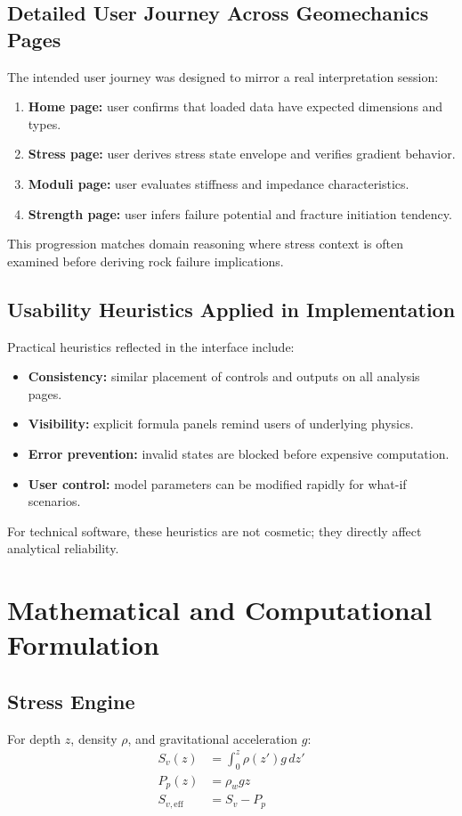 \documentclass[12pt,a4paper]{report}
\begin{document}
\section{Detailed User Journey Across Geomechanics Pages}
The intended user journey was designed to mirror a real interpretation session:
\begin{enumerate}
    \item \textbf{Home page:} user confirms that loaded data have expected dimensions and types.
    \item \textbf{Stress page:} user derives stress state envelope and verifies gradient behavior.
    \item \textbf{Moduli page:} user evaluates stiffness and impedance characteristics.
    \item \textbf{Strength page:} user infers failure potential and fracture initiation tendency.
\end{enumerate}

This progression matches domain reasoning where stress context is often examined before deriving rock failure implications.

\section{Usability Heuristics Applied in Implementation}
Practical heuristics reflected in the interface include:
\begin{itemize}
    \item \textbf{Consistency:} similar placement of controls and outputs on all analysis pages.
    \item \textbf{Visibility:} explicit formula panels remind users of underlying physics.
    \item \textbf{Error prevention:} invalid states are blocked before expensive computation.
    \item \textbf{User control:} model parameters can be modified rapidly for what-if scenarios.
\end{itemize}

For technical software, these heuristics are not cosmetic; they directly affect analytical reliability.

\chapter{Mathematical and Computational Formulation}
\section{Stress Engine}
For depth $z$, density $\rho$, and gravitational acceleration $g$:
\begin{align}
S_v(z) &= \int_0^z \rho(z')g\,dz' \\
P_p(z) &= \rho_w g z \\
S_{v,\mathrm{eff}} &= S_v - P_p
\end{align}
\end{document}
